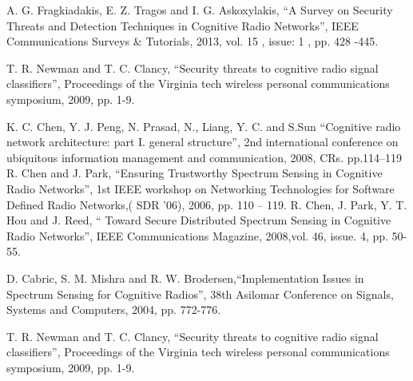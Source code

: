 \documentclass{article}
\begin{document}
\begin{thebibliography}{00}
A. G. Fragkiadakis, E. Z. Tragos and I. G.
Askoxylakis, “A Survey on Security Threats and
Detection Techniques in Cognitive Radio
Networks”, IEEE Communications Surveys &
Tutorials, 2013, vol. 15 , issue: 1 , pp. 428 -445.

T. R. Newman and T. C. Clancy, “Security threats
to cognitive radio signal classifiers”, Proceedings
of the Virginia tech wireless personal
communications symposium, 2009, pp. 1-9.

K. C. Chen, Y. J. Peng, N. Prasad, N., Liang, Y. C.
and S.Sun “Cognitive radio network architecture:
part I. general structure”, 2nd international
conference on ubiquitous information management
and communication, 2008, CRs. pp.114–119
 R. Chen and J. Park, “Ensuring Trustworthy
Spectrum Sensing in Cognitive Radio Networks”,
1st IEEE workshop on Networking Technologies
for Software Defined Radio Networks,( SDR '06),
2006, pp. 110 – 119.
R. Chen, J. Park, Y. T. Hou and J. Reed, “ Toward
Secure Distributed Spectrum Sensing in Cognitive
Radio Networks”, IEEE Communications
Magazine, 2008,vol. 46, issue. 4, pp. 50-55.

  D. Cabric, S. M. Mishra and R. W.
Brodersen,“Implementation Issues in Spectrum
Sensing for Cognitive Radios”, 38th Asilomar
Conference on Signals, Systems and Computers,
2004, pp. 772-776.

T. R. Newman and T. C. Clancy, “Security threats
to cognitive radio signal classifiers”, Proceedings
of the Virginia tech wireless personal
communications symposium, 2009, pp. 1-9.

\end{thebibliography}
\end{document}
